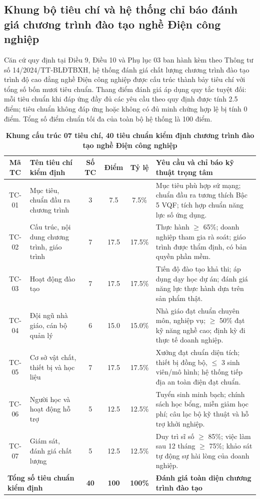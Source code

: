 \newpage
\subsection{Khung bộ tiêu chí và hệ thống chỉ báo đánh giá chương trình đào tạo nghề Điện công nghiệp}

Căn cứ quy định tại Điều 9, Điều 10 và Phụ lục 03 ban hành kèm theo Thông tư số 14/2024/TT-BLĐTBXH, hệ thống đánh giá chất lượng chương trình đào tạo trình độ cao đẳng nghề Điện công nghiệp được cấu trúc thành bảy tiêu chí với tổng số bốn mươi tiêu chuẩn. Thang điểm đánh giá áp dụng quy tắc tuyệt đối: mỗi tiêu chuẩn khi đáp ứng đầy đủ các yêu cầu theo quy định được tính 2.5 điểm; tiêu chuẩn không đáp ứng hoặc không có đủ minh chứng hợp lệ bị tính 0 điểm. Tổng số điểm chuẩn tối đa của toàn bộ hệ thống là 100 điểm.

\begin{table}[htbp]
\centering
\footnotesize
\setlength{\tabcolsep}{3.5pt}
\renewcommand{\arraystretch}{1.1}
\caption{\textbf{Khung cấu trúc 07 tiêu chí, 40 tiêu chuẩn kiểm định chương trình đào tạo nghề Điện công nghiệp}}
\label{tab:bang2_1}
\vspace{0.2cm}
\begin{tabularx}{\textwidth}{c l c c c X}
\toprule
\textbf{Mã TC} & \textbf{Tên tiêu chí kiểm định} & \textbf{Số TC} & \textbf{Điểm} & \textbf{Tỷ lệ} & \textbf{Yêu cầu và chỉ báo kỹ thuật trọng tâm} \\
\midrule
TC-01 & Mục tiêu, chuẩn đầu ra chương trình & 3 & 7.5 & 7.5\% & Mục tiêu phù hợp sứ mạng; chuẩn đầu ra tương thích Bậc 5 VQF; tích hợp chuẩn năng lực số ứng dụng. \\
TC-02 & Cấu trúc, nội dung chương trình, giáo trình & 7 & 17.5 & 17.5\% & Thực hành $\ge$ 65\%; doanh nghiệp tham gia rà soát; giáo trình được thẩm định, có bản quyền phần mềm. \\
TC-03 & Hoạt động đào tạo & 7 & 17.5 & 17.5\% & Tiến độ đào tạo khả thi; áp dụng dạy học dự án; đánh giá năng lực thực hành dựa trên sản phẩm thật. \\
TC-04 & Đội ngũ nhà giáo, cán bộ quản lý & 6 & 15.0 & 15.0\% & Nhà giáo đạt chuẩn chuyên môn, nghiệp vụ; $\ge$ 50\% đạt kỹ năng nghề cao; định kỳ đi thực tế doanh nghiệp. \\
TC-05 & Cơ sở vật chất, thiết bị và học liệu & 7 & 17.5 & 17.5\% & Xưởng đạt chuẩn diện tích; thiết bị đồng bộ, $\le$ 3 sinh viên/mô hình; hệ thống tiếp địa an toàn điện đạt chuẩn. \\
TC-06 & Người học và hoạt động hỗ trợ & 5 & 12.5 & 12.5\% & Tuyển sinh minh bạch; chính sách học bổng, miễn giảm học phí; câu lạc bộ kỹ thuật và hỗ trợ khởi nghiệp. \\
TC-07 & Giám sát, đánh giá chất lượng & 5 & 12.5 & 12.5\% & Duy trì sĩ số $\ge$ 85\%; việc làm sau 12 tháng $\ge$ 75\%; khảo sát tự động sự hài lòng của doanh nghiệp. \\
\midrule
\multicolumn{2}{l}{\textbf{Tổng số tiêu chuẩn kiểm định}} & \textbf{40} & \textbf{100} & \textbf{100\%} & \textbf{Đánh giá toàn diện chương trình đào tạo} \\
\bottomrule
\end{tabularx}
\end{table}

